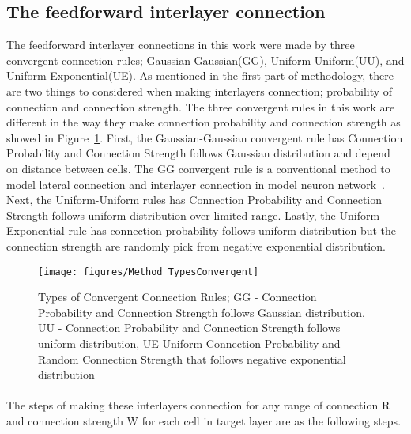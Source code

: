 \subsection{The feedforward interlayer connection}
The feedforward interlayer connections in this work were made by three convergent connection rules; Gaussian-Gaussian(GG), Uniform-Uniform(UU), and Uniform-Exponential(UE). As mentioned in the first part of methodology, there are two things to considered when making interlayers connection; probability of connection and connection strength. The three convergent rules in this work are different in the way they make connection probability and connection strength as showed in Figure~\ref{fig:ConvergentRule}. First, the Gaussian-Gaussian convergent rule has Connection Probability and Connection Strength follows Gaussian distribution and depend on distance between cells. The GG convergent rule is a conventional method to model lateral connection and interlayer connection in model neuron network~\cite{ringach2004haphazard,paik2009spontaneous, paik2010synaptic}. Next, the Uniform-Uniform rules has Connection Probability and Connection Strength follows uniform distribution over limited range. Lastly, the Uniform-Exponential rule has connection probability follows uniform distribution but the connection strength are randomly pick from negative exponential distribution.
\begin{figure}[!h]
	\centering
	\texttt{[image: figures/Method\_TypesConvergent]}
	\caption{Types of Convergent Connection Rules; GG - Connection Probability and Connection Strength follows Gaussian distribution, UU - Connection Probability and Connection Strength follows uniform distribution, UE-Uniform Connection Probability and Random Connection Strength that follows negative exponential distribution }
	\label{fig:ConvergentRule}
\end{figure} 

\paragraph{} The steps of making these interlayers connection for any range of connection R and connection strength W for each cell in target layer are as the following steps. 

